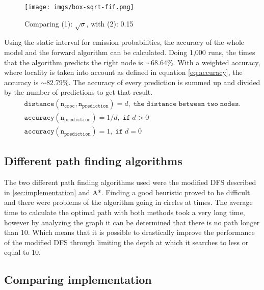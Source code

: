 \documentclass[12pt, a4paper]{article}
\begin{document}
\begin{figure}[!ht]\label{fig:box-sqrt-fif.png}
\centering
\texttt{[image: imgs/box-sqrt-fif.png]}\\
\caption{Comparing (1): $\sqrt{\sigma}$, with (2): 0.15}
\end{figure}

Using the static interval for emission probabilities, the accuracy of the whole model and the forward algorithm can be calculated. Doing 1,000 runs, the times that the algorithm predicts the right node is $\sim68.64\%$. With a weighted accuracy, where locality is taken into account as defined in equation \ref{eq:accuracy}, the accuracy is $\sim82.79\%$. The accuracy of every prediction is summed up and divided by the number of predictions to get that result.
\begin{equation}\label{eq:accuracy}
\begin{split}
\mathtt{distance(n_{croc}, n_{prediction})}=d, \; \mathtt{the \; distance \; between \; two \; nodes.}
\\
\mathtt{accuracy(n_{prediction})} = 1 / d, \; \mathtt{if} \; d > 0 \hspace{151pt}
\\
\mathtt{accuracy(n_{prediction})} = 1, \; \mathtt{if} \; d = 0 \hspace{163pt}
\end{split}
\end{equation}

\subsection{Different path finding algorithms}

The two different path finding algorithms used were the modified DFS described in \ref{sec:implementation} and A*\cite{aStar}. Finding a good heuristic proved to be difficult and there were problems of the algorithm going in circles at times. The average time to calculate the optimal path with both methods took a very long time, however by analyzing the graph it can be determined that there is no path longer than 10. Which means that it is possible to drastically improve the performance of the modified DFS through limiting the depth at which it searches to less or equal to 10.

\subsection{Comparing implementation}
\end{document}
